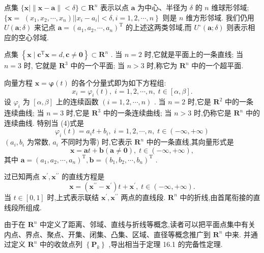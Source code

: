 点集 \(\{ \mathbf{x} \mid  \parallel \mathbf{x} - \mathbf{a}\parallel  < \delta \}  \subset  {\mathbf{R}}^{n}\) 表示以点 \(\mathbf{a}\) 为中心、半径为 \(\delta\) 的 \(n\) 维球形邻域; \(\{ \mathbf{x} =\)  \(\left. {\left( {{x}_{1},{x}_{2},\cdots ,{x}_{n}}\right) \left| \right| {x}_{i} - {a}_{i} \mid   < \delta ,i = 1,2,\cdots ,n}\right\}\) 则是 \(n\) 维方形邻域. 我们仍用 \(U\left( {\mathbf{a};\delta }\right)\) 来记点 \(\mathbf{a} = {\left( {a}_{1},{a}_{2},\cdots ,{a}_{n}\right) }^{\mathrm{T}}\) 的上述这两类邻域,而 \({U}^{ \circ  }\left( {\mathbf{a};\delta }\right)\) 则表示相应的空心邻域.

点集 \(\left\{  {\mathbf{x} \mid  {\mathbf{c}}^{\mathrm{T}}\mathbf{x} = d,\mathbf{c} \neq  \mathbf{0}}\right\}   \subset  {\mathbf{R}}^{n}\) . 当 \(n = 2\) 时,它就是平面上的一条直线; 当 \(n = 3\) 时, 它就是 \({\mathbf{R}}^{3}\) 中的一个平面; 当 \(n > 3\) 时,称它为 \({\mathbf{R}}^{n}\) 中的一个超平面.

向量方程 \(\mathbf{x} = \mathbf{\varphi }\left( t\right)\) 的各个分量式即为如下方程组:
\[
{x}_{i} = {\varphi }_{i}\left( t\right) ,\;i = 1,2,\cdots ,n,\;t \in  \left\lbrack  {\alpha ,\beta }\right\rbrack  . \tag{4}
\]
设 \({\varphi }_{i}\) 为 \(\left\lbrack  {\alpha ,\beta }\right\rbrack\) 上的连续函数 \(\left( {i = 1,2,\cdots ,n}\right)\) . 当 \(n = 2\) 时,它是 \({\mathbf{R}}^{2}\) 中的一条连续曲线; 当 \(n = 3\) 时,它是 \({\mathbf{R}}^{3}\) 中的一条连续曲线; 当 \(n > 3\) 时,仍称它是 \({\mathbf{R}}^{n}\) 中的连续曲线. 特别当 (4)式是
\[
{\varphi }_{i}\left( t\right)  = {a}_{i}t + {b}_{i},\;i = 1,2,\cdots ,n,\;t \in  \left( {-\infty , + \infty }\right)
\]
\(\left( {{a}_{i},{b}_{i}}\right.\) 为常数, \({a}_{i}\) 不同时为零) 时,它表示 \({\mathbf{R}}^{n}\) 中的一条直线,其向量形式是
\[
\mathbf{x} = \mathbf{a}t + \mathbf{b}\left( {\mathbf{a} \neq  \mathbf{0}}\right) ,\;t \in  \left( {-\infty , + \infty }\right) ,
\]
其中 \(\mathbf{a} = {\left( {a}_{1},{a}_{2},\cdots ,{a}_{n}\right) }^{\mathrm{T}},\mathbf{b} = {\left( {b}_{1},{b}_{2},\cdots ,{b}_{n}\right) }^{\mathrm{T}}\) .

过已知两点 \({\mathbf{x}}^{\prime },{\mathbf{x}}^{\prime \prime }\) 的直线方程是
\[
\mathbf{x} = \left( {{\mathbf{x}}^{\prime \prime } - {\mathbf{x}}^{\prime }}\right) t + {\mathbf{x}}^{\prime },\;t \in  \left( {-\infty , + \infty }\right) .
\]
当 \(t \in  \left\lbrack  {0,1}\right\rbrack\) 时,上式表示联结 \({\mathbf{x}}^{\prime },{\mathbf{x}}^{\prime \prime }\) 两点的直线段. \({\mathbf{R}}^{n}\) 中的折线,由首尾衔接的直线段所组成.

由于在 \({\mathbf{R}}^{n}\) 中定义了距离、邻域、直线与折线等概念,读者可以把平面点集中有关内点、界点、聚点、开集、闭集、凸集、区域、直径等概念推广到 \({\mathbf{R}}^{n}\) 中来. 并通过定义 \({\mathbf{R}}^{n}\) 中的收敛点列 \(\left\{  {\mathbf{P}}_{k}\right\}\) ,导出相当于定理 16.1 的完备性定理.

